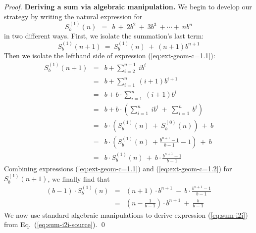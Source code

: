 \begin{proof}
{\bf Deriving a sum via algebraic manipulation.}
We begin to develop our strategy by writing the natural expression for
\[ S_b^{(1)}(n) \ \ = \ \ b \ + \ 2b^2 \ + \ 3 b^3 \ + \cdots + \ n b^n  \]
in two different ways.  First, we isolate the summation's last term:
\begin{equation}
\label{eq:ext-geom-c=1.1}
S_b^{(1)}(n+1) \ = \ S_b^{(1)}(n) \ + \ (n+1) b^{n+1}
\end{equation}
Then we isolate the lefthand side of expression (\ref{eq:ext-geom-c=1.1}):
\begin{eqnarray}
\nonumber
S_b^{(1)}(n+1)
     & = &
b + \sum_{i=2}^{n+1} \ i b^{i}  \\
\nonumber
& = &
b + \sum_{i=1}^n \ (i+1) b^{i+1}  \\
\nonumber
     & = &
b +  b \cdot \sum_{i=1}^n \ (i+1) b^i \\
\nonumber
     & = &
b + 
b \cdot \left(
\sum_{i=1}^n \ i b^i 
 \ + \
\sum_{i=1}^n \  b^i 
\right) \\
\nonumber
     & = &
b \cdot \left( S_b^{(1)}(n) \ + \ S_b^{(0)}(n) \right) \ + \ b \\
\nonumber
& = &
b \cdot \left( S_b^{(1)}(n) \ +  \frac{b^{n+1} -1}{b-1} -1 \right) \ + \ b \\
\label{eq:ext-geom-c=1.2}
    & = &
b \cdot S_b^{(1)}(n) \ + \ b \cdot \frac{b^{n+1} - 1}{b-1}
\end{eqnarray}
Combining expressions (\ref{eq:ext-geom-c=1.1}) and (\ref{eq:ext-geom-c=1.2}) for $S_b^{(1)}(n+1)$, we finally find that
\begin{eqnarray}
\nonumber
(b-1) \cdot S_b^{(1)}(n) & = &
(n+1) \cdot b^{n+1} \ - \ b \cdot \frac{b^{n+1} -1}{b-1} \\
\label{eq:sum-i2i-source}
 & = &
\left( n - \frac{1}{b-1} \right) \cdot b^{n+1} \ + \ \frac{b}{b-1}
\end{eqnarray}
We now use standard algebraic manipulations to derive expression (\ref{eq:sum-i2i}) from Eq.~(\ref{eq:sum-i2i-source}).  \qed
\end{proof}

